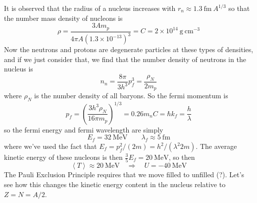 \documentclass[10pt]{article}
\numberwithin{equation}{section}
\newcommand{\avg}[1]{\left\langle#1\right\rangle}
\begin{document}
  It is observed that the radius of a nucleus increases with
  $r_n\approx 1.3\ \mathrm{fm}\ A^{1/3}$
  so that the number mass density of nucleons is
  \begin{equation}
    \label{eq:374}
    \rho=\frac{3 A m_p}{4\pi A\left(1.3\times
        10^{-13}\right)^3}=C=2\times 10^{14}\ \mathrm{g\ cm^{-3}}
  \end{equation}
  Now the neutrons and protons are degenerate particles at these types
  of densities, and if we just consider that, we find that the number
  density of neutrons in the nucleus is
  \begin{equation}
    \label{eq:375}
    n_n=\frac{8\pi}{3h^3}p_f^3=\frac{\rho_N}{2m_p}
  \end{equation}
  where $\rho_N$ is the number density of all baryons. So the fermi momentum is
  \begin{equation}
    \label{eq:376}
    p_f=\left(\frac{3h^3\rho_N}{16\pi m_p}\right)^{1/3}=0.26 m_nC=\hbar k_f=\frac{h}{\lambda}
  \end{equation}
  so the fermi energy and fermi wavelength are simply
  \begin{equation}
    \label{eq:377}
    E_f=32\ \mathrm{MeV}\qquad \lambda_f\approx 5\ \mathrm{fm}
  \end{equation}
  where we've used the fact that $E_f=p_f^2/(2m)=h^2/(\lambda^2
  2m)$. The average kinetic energy of these nucleons is then
  $\frac{3}{5}E_f=20\ \mathrm{MeV}$, so then
  \begin{equation}
    \label{eq:378}
    \avg{T}\approx 20\ \mathrm{MeV}\quad\Rightarrow \quad U=-40\ \mathrm{MeV}
  \end{equation}
  The Pauli Exclusion Principle requires that we move filled to
  unfilled (?). Let's see how this changes the kinetic energy content
  in the nucleus relative to $Z=N=A/2$.\\
\end{document}
